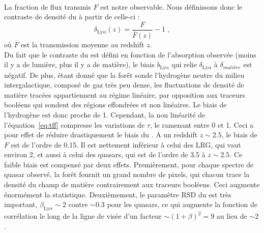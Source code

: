 \documentclass[11pt, twoside, a4paper, openright]{report}
\begin{document}
\paragraph{}
La fraction de flux transmis $F$ est notre observable. Nous définissons donc le contraste de densité du \lya{} à partir de celle-ci : 
\begin{equation}
  \label{eq:delta_lya}
  \delta_{\mathrm{Ly}\alpha}(z) = \frac{F}{\overline F(z)} - 1  \; , 
\end{equation}
où $\overline F$ est la transmission moyenne au redshift $z$.\\
Du fait que le contraste du \lya{} est défini en fonction de l'absorption observée (moins il y a de lumière, plus il y a de matière), le biais $b_{\mathrm{Ly}\alpha}$ qui relie $\delta_{\mathrm{Ly}\alpha}$ à $\delta_{matière}$ est négatif.
De plus, étant donné que la forêt \lya{} sonde l'hydrogène neutre du milieu intergalactique, composé de gaz très peu dense, les fluctuations de densité de matière tracées appartiennent au régime linéaire, par opposition aux traceurs booléens qui sondent des régions effondrées et non linéaires. Le biais de l'hydrogène est donc proche de 1. Cependant, la non linéarité de l'équation~\ref{eq:tff} compresse les variations de $\tau$, le ramenant entre 0 et 1. Ceci a pour effet de réduire drastiquement le biais du \lya{}. A un redshift $z \sim \num{2.5}$, le biais de $F$ est de l'ordre de \num{0.15}. Il est nettement inférieur à celui des LRG, qui vaut environ 2, et aussi à celui des quasars, qui est de l'ordre de \num{3.5} à $z \sim \num{2.5}$.
Ce faible biais est compensé par deux effets.
Premièrement, pour chaque spectre de quasar observé, la forêt \lya{} fournit un grand nombre de pixels, qui chacun trace la densité du champ de matière contrairement aux traceurs booléens. Ceci augmente énormément la statistique.
Deuxièmement, le paramêtre RSD du \lya{} est très important, $\beta_{\mathrm{Ly}\alpha} \sim 2$ contre $\sim \num{0.3}$ pour les quasars, ce qui augmente  la fonction de corrélation le long de la ligne de visée d'un facteur $\sim (1+\beta)^2 = 9$ au lieu de $\sim 2$.
\end{document}
